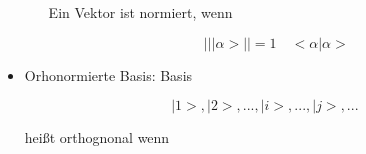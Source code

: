 \documentclass[10pt,article,colorback,accentcolor=tud9d]{scrartcl}
\begin{document}
\begin{itemize}
\begin{itemize}
Ein Vektor ist normiert, wenn
\begin{fleqn}
\begin{equation}
\left|\right|\left|\right.\alpha>\left|\right| =1 \quad <\alpha\left|\right.\alpha>
\end{equation}
\end{fleqn}
\end{itemize}
\item Orhonormierte Basis: Basis
\begin{fleqn}
\begin{equation}
{\left|\right.1>,\left|\right.2>,...,\left|\right.i>,...,\left|\right.j>,...}
\end{equation}
\end{fleqn}
heißt orthognonal wenn
\end{itemize}
\end{document}
